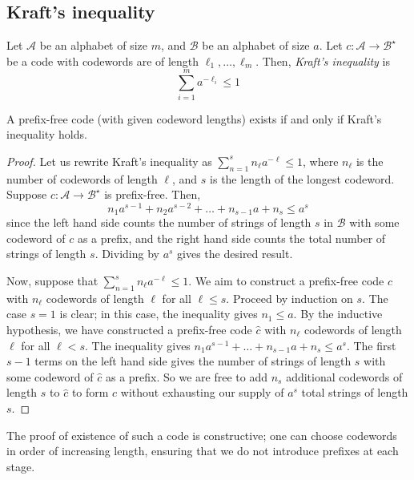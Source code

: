 \subsection{Kraft's inequality}
\begin{definition}
    Let \( \mathcal A \) be an alphabet of size \( m \), and \( \mathcal B \) be an alphabet of size \( a \).
    Let \( c \colon \mathcal A \to \mathcal B^\star \) be a code with codewords are of length \( \ell_1, \dots, \ell_m \).
    Then, \emph{Kraft's inequality} is
    \[ \sum_{i=1}^m a^{-\ell_i} \leq 1 \]
\end{definition}
\begin{theorem}
    A prefix-free code (with given codeword lengths) exists if and only if Kraft's inequality holds.
\end{theorem}
\begin{proof}
    Let us rewrite Kraft's inequality as \( \sum_{n=1}^s n_\ell a^{-\ell} \leq 1 \), where \( n_\ell \) is the number of codewords of length \( \ell \), and \( s \) is the length of the longest codeword.
    Suppose \( c \colon \mathcal A \to \mathcal B^\star \) is prefix-free.
    Then,
    \[ n_1 a^{s-1} + n_2 a^{s-2} + \dots + n_{s-1} a + n_s \leq a^s \]
    since the left hand side counts the number of strings of length \( s \) in \( \mathcal B \) with some codeword of \( c \) as a prefix, and the right hand side counts the total number of strings of length \( s \).
    Dividing by \( a^s \) gives the desired result.

    Now, suppose that \( \sum_{n=1}^s n_\ell a^{-\ell} \leq 1 \).
    We aim to construct a prefix-free code \( c \) with \( n_\ell \) codewords of length \( \ell \) for all \( \ell \leq s \).
    Proceed by induction on \( s \).
    The case \( s = 1 \) is clear; in this case, the inequality gives \( n_1 \leq a \).
    By the inductive hypothesis, we have constructed a prefix-free code \( \hat c \) with \( n_\ell \) codewords of length \( \ell \) for all \( \ell < s \).
    The inequality gives \( n_1 a^{s-1} + \dots + n_{s-1} a + n_s \leq a^s \).
    The first \( s - 1 \) terms on the left hand side gives the number of strings of length \( s \) with some codeword of \( \hat c \) as a prefix.
    So we are free to add \( n_s \) additional codewords of length \( s \) to \( \hat c \) to form \( c \) without exhausting our supply of \( a^s \) total strings of length \( s \).
\end{proof}
\begin{remark}
    The proof of existence of such a code is constructive; one can choose codewords in order of increasing length, ensuring that we do not introduce prefixes at each stage.
\end{remark}

